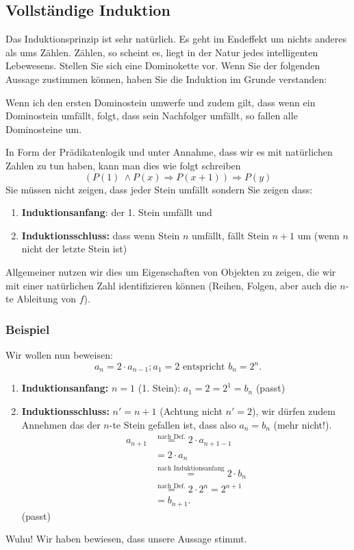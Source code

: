 \subsection{Vollständige Induktion}
Das Induktionsprinzip ist sehr natürlich. Es geht im Endeffekt um nichts anderes als ums Zählen. Zählen, so scheint es, liegt in der Natur jedes intelligenten Lebewesens. Stellen Sie sich eine Dominokette vor. Wenn Sie der folgenden Aussage zustimmen können, haben Sie die Induktion im Grunde verstanden:
\begin{center}
Wenn ich den ersten Dominostein umwerfe und zudem gilt, dass wenn ein Dominostein umfällt, folgt, dass sein Nachfolger umfällt, so fallen alle Dominosteine um.
\end{center}
In Form der Prädikatenlogik und unter Annahme, dass wir es mit natürlichen Zahlen zu tun haben, kann man dies wie folgt schreiben
\begin{equation*}
(P(1) \ \land P(x) \Rightarrow P(x+1)) \Rightarrow P(y)
\end{equation*}
Sie müssen nicht zeigen, dass jeder Stein umfällt sondern Sie zeigen dass:
\begin{enumerate}
\item \textbf{Induktionsanfang}: der 1. Stein umfällt und
\item \textbf{Induktionsschluss:} dass wenn Stein $n$ umfällt, fällt Stein $n+1$ um (wenn $n$ nicht der letzte Stein ist)
\end{enumerate}
Allgemeiner nutzen wir dies um Eigenschaften von Objekten zu zeigen, die wir mit einer natürlichen Zahl identifizieren können (Reihen, Folgen, aber auch die $n$-te Ableitung von $f$).

\subsubsection{Beispiel}
Wir wollen nun beweisen:
\begin{equation}
a_{n} = 2 \cdot a_{n-1}; a_1 = 2 \text{ entspricht } b_n = 2^n.
\end{equation}
\begin{enumerate}
\item \textbf{Induktionsanfang:} $n = 1$ (1. Stein): $ a_1 = 2 = 2^1 = b_n$ (passt)
\item \textbf{Induktionsschluss:} $n' = n + 1$ (Achtung nicht $n' = 2$), wir dürfen zudem Annehmen das der $n$-te Stein gefallen ist, dass also $a_n = b_n$ (mehr nicht!).
\begin{align*}
a_{n+1} &\stackrel{\text{nach Def.}}{=} 2 \cdot a_{n+1-1} \\
&=  2 \cdot a_{n} \\
&\stackrel{\text{nach Induktionsanfang}}{=} 2 \cdot b_n \\
&\stackrel{\text{nach Def.}}{=} 2 \cdot 2^n = 2^{n+1} \\
&= b_{n+1}.
\end{align*}
(passt)
\end{enumerate}
Wuhu! Wir haben bewiesen, dass unsere Aussage stimmt.

